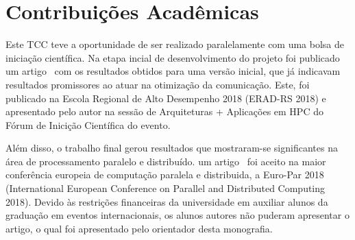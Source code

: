 %

\chapter{Contribuições Acadêmicas}
\label{cap:contribuicoes}

Este TCC teve a oportunidade de ser realizado
paralelamente com uma bolsa de iniciação científica.
Na etapa incial de desenvolvimento do projeto foi 
publicado um artigo~\cite{ERAD-RS} com os resultados
obtidos para uma versão inicial, que já indicavam 
resultados promissores ao atuar na otimização da 
comunicação. Este, foi publicado na Escola Regional de
Alto Desempenho 2018 (ERAD-RS 2018) e apresentado pelo autor
na sessão de Arquiteturas + Aplicações em HPC do Fórum
de Inicição Científica do evento.

Além disso, o trabalho final gerou resultados que
mostraram-se significantes na área de processamento
paralelo e distribuído. um artigo~\cite{10.1007/978-3-319-96983-1_46} foi aceito na maior
conferência europeia de computação paralela e distribuida, a Euro-Par 2018 (International European Conference on Parallel and Distributed Computing 2018).
Devido às restrições financeiras da universidade em
auxiliar alunos da graduação em eventos internacionais,
os alunos autores não puderam apresentar o artigo, o 
qual foi apresentado pelo orientador desta monografia.